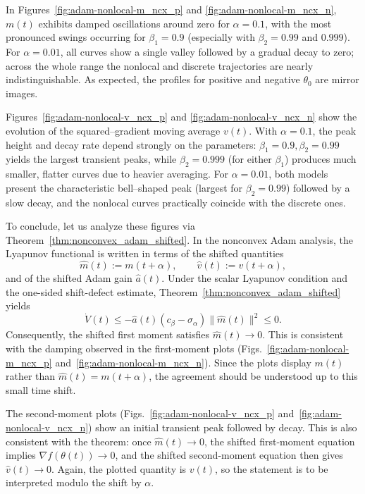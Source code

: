 \documentclass{article} %
\begin{document}
In Figures~\ref{fig:adam-nonlocal-m_ncx_p} and \ref{fig:adam-nonlocal-m_ncx_n}, \(m(t)\) exhibits damped oscillations around zero for \(\alpha=0.1\), with the most pronounced swings occurring for \(\beta_1=0.9\) (especially with \(\beta_2=0.99\) and \(0.999\)). For \(\alpha=0.01\), all curves show a single valley followed by a gradual decay to zero; across the whole range the nonlocal and discrete trajectories are nearly indistinguishable. As expected, the profiles for positive and negative \(\theta_0\) are mirror images.

Figures~\ref{fig:adam-nonlocal-v_ncx_p} and \ref{fig:adam-nonlocal-v_ncx_n} show the evolution of the squared–gradient moving average $v(t)$. With \(\alpha=0.1\), the peak height and decay rate depend strongly on the parameters: \(\beta_1=0.9,\beta_2=0.99\) yields the largest transient peaks, while \(\beta_2=0.999\) (for either \(\beta_1\)) produces much smaller, flatter curves due to heavier averaging. For \(\alpha=0.01\), both models present the characteristic bell–shaped peak (largest for \(\beta_2=0.99\)) followed by a slow decay, and the nonlocal curves practically coincide with the discrete ones.

To conclude, let us analyze these figures via Theorem~\ref{thm:nonconvex_adam_shifted}. In the nonconvex Adam analysis, the Lyapunov functional is written in terms of the shifted quantities
\[
    \widehat m(t):=m(t+\alpha),
    \qquad
    \widehat v(t):=v(t+\alpha),
\]
and of the shifted Adam gain $\widehat a(t)$. Under the scalar Lyapunov condition and the one-sided shift-defect estimate, Theorem~\ref{thm:nonconvex_adam_shifted} yields
\[
    \dot V(t)
    \leq
    -\widehat a(t)(c_\beta-\sigma_\alpha)\|\widehat m(t)\|^2
    \leq 0.
\]
Consequently, the shifted first moment satisfies $\widehat m(t)\to0$. This is consistent with the damping observed in the first-moment plots (Figs.~\ref{fig:adam-nonlocal-m_ncx_p} and~\ref{fig:adam-nonlocal-m_ncx_n}). Since the plots display $m(t)$ rather than $\widehat m(t)=m(t+\alpha)$, the agreement should be understood up to this small time shift.

The second-moment plots (Figs.~\ref{fig:adam-nonlocal-v_ncx_p} and~\ref{fig:adam-nonlocal-v_ncx_n}) show an initial transient peak followed by decay. This is also consistent with the theorem: once $\widehat m(t)\to0$, the shifted first-moment equation implies $\nabla f(\theta(t))\to0$, and the shifted second-moment equation then gives $\widehat v(t)\to0$. Again, the plotted quantity is $v(t)$, so the statement is to be interpreted modulo the shift by $\alpha$.
\end{document}
